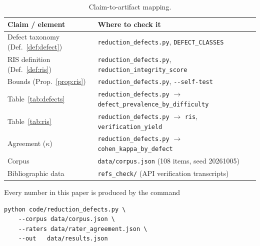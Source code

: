 \documentclass[11pt,a4paper]{article}
\theoremstyle{plain}
\theoremstyle{definition}
\newcommand{\RIS}{\textnormal{\textsc{RIS}}}
\newcommand{\code}[1]{\texttt{#1}}
\begin{document}
\begin{table}[h]
\centering
\caption{Claim-to-artifact mapping.}
\begin{tabularx}{\textwidth}{@{}lX@{}}
\toprule
Claim / element & Where to check it \\
\midrule
Defect taxonomy (Def.~\ref{def:defect}) & \code{reduction\_defects.py}, \texttt{DEFECT\_CLASSES} \\
\RIS{} definition (Def.~\ref{def:ris}) & \code{reduction\_defects.py}, \texttt{reduction\_integrity\_score} \\
Bounds (Prop.~\ref{prop:ris}) & \code{reduction\_defects.py}, \texttt{-{}-self-test} \\
Table~\ref{tab:defects} & \code{reduction\_defects.py} $\to$ \texttt{defect\_prevalence\_by\_difficulty} \\
Table~\ref{tab:ris} & \code{reduction\_defects.py} $\to$ \texttt{ris}, \texttt{verification\_yield} \\
Agreement ($\kappa$) & \code{reduction\_defects.py} $\to$ \texttt{cohen\_kappa\_by\_defect} \\
Corpus & \code{data/corpus.json} (108 items, seed 20261005) \\
Bibliographic data & \code{refs\_check/} (API verification transcripts) \\
\bottomrule
\end{tabularx}
\end{table}

Every number in this paper is produced by the command
\begin{verbatim}
python code/reduction_defects.py \
    --corpus data/corpus.json \
    --raters data/rater_agreement.json \
    --out   data/results.json
\end{verbatim}
\end{document}
